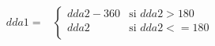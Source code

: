 \begin{equation*}
\begin{aligned}
dda1 = &
\begin{cases}
dda2-360 & \text{si $dda2 > 180$}\\
dda2 & \text{si $dda2 <= 180$}\\
\end{cases} \\
\end{aligned}
\end{equation*}

